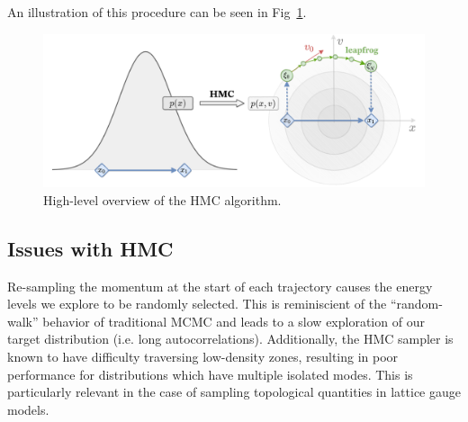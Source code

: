 \documentclass[a4paper,11pt]{article}
\begin{document}
%
An illustration of this procedure can be seen in Fig~\ref{fig:hmc}.
%
\begin{figure}[htpb]
    \centering
    \includegraphics[width=\textwidth]{assets/hmc.pdf}
    \caption{\label{fig:hmc}High-level overview of the HMC algorithm.}
\end{figure}
%
\subsection{\label{subsec:hmc_issues}Issues with HMC}
%
Re-sampling the momentum at the start of each trajectory causes the energy
levels we explore to be randomly selected.
%
This is reminiscient of the ``random-walk'' behavior of traditional MCMC and
leads to a slow exploration of our target distribution (i.e. long
autocorrelations).
%
Additionally, the HMC sampler is known to have difficulty traversing
low-density zones, resulting in poor performance for distributions which have
multiple isolated modes.
%
This is particularly relevant in the case of sampling topological quantities in
lattice gauge models.
%
%
%
\end{document}
